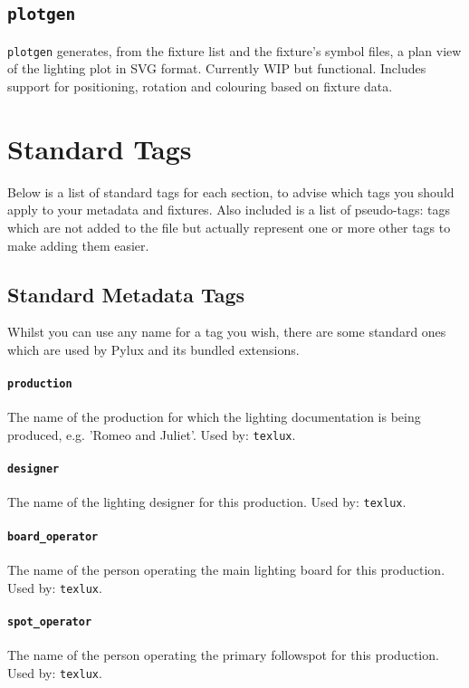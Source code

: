 \documentclass[a4paper]{article}
\begin{document}
\subsection{\texttt{plotgen}}
\texttt{plotgen} generates, from the fixture list and the fixture's symbol 
files, a plan view of the lighting plot in SVG format. Currently WIP but 
functional. Includes support for positioning, rotation and colouring based 
on fixture data.

\section{Standard Tags} \label{sec:plotfile}
Below is a list of standard tags for each section, to advise which tags you 
should apply to your metadata and fixtures. Also included is a list of 
pseudo-tags: tags which are not added to the file but actually represent one 
or more other tags to make adding them easier.

\subsection{Standard Metadata Tags}
Whilst you can use any name for a tag you wish, there are some standard ones 
which are used by Pylux and its bundled extensions.

\paragraph{\texttt{production}}
The name of the production for which the lighting documentation is being 
produced, e.g. 'Romeo and Juliet'. Used by: \texttt{texlux}.

\paragraph{\texttt{designer}}
The name of the lighting designer for this production. Used by: 
\texttt{texlux}.

\paragraph{\texttt{board\_operator}}
The name of the person operating the main lighting board for this production.
Used by: \texttt{texlux}.

\paragraph{\texttt{spot\_operator}}
The name of the person operating the primary followspot for this production.
Used by: \texttt{texlux}.
\end{document}
